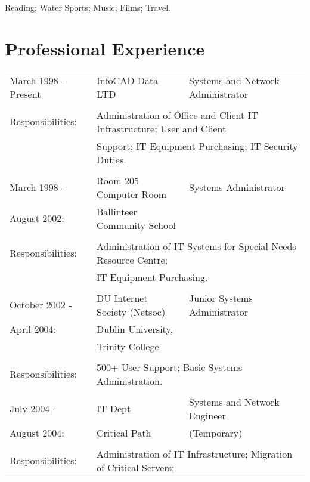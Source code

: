 \documentclass[a4paper, 11pt] {article}
\begin{document}
Reading; Water Sports; Music; Films; Travel.

\section*{Professional Experience}

\begin{tabular}{llll}
March 1998 - Present	&	InfoCAD Data LTD	& Systems and Network Administrator	&	\hspace{10mm}	\\
      	&			&              &            			\\
Responsibilities:	& \multicolumn{3}{l}{Administration of Office and Client IT Infrastructure; User and Client} 	\\
						& \multicolumn{3}{l}{Support; IT Equipment Purchasing; IT Security Duties.} 	\\
      				&              						&  &	\\
March 1998 -		& 	Room 205 Computer Room			&	Systems Administrator	& \hspace{10mm}	\\
August 2002:		&  Ballinteer Community School	&	&	\\
						& 		&	\\
Responsibilities:	& \multicolumn{3}{l}{Administration of IT Systems for Special Needs Resource Centre;} 	\\
						& \multicolumn{3}{l}{IT Equipment Purchasing.} 	\\
						&                      				&	&	\\
October 2002 - 	&  DU Internet Society (Netsoc)	&	Junior Systems Administrator	& \hspace{10mm}\\
April 2004:			& 	Dublin University,				&	&	\\
						&  Trinity College					&	&	\\
						& 											&	&	\\
Responsibilities:	& \multicolumn{3}{l}{500+ User Support; Basic Systems
Administration.} 	\\
						&											&	&	\\
July 2004 -			& IT Dept								&	Systems and Network Engineer	& \hspace{10mm}\\
August 2004:		& Critical Path						& (Temporary)	&	\\
						& 											&	&	\\
Responsibilities:	& \multicolumn{3}{l}{Administration of IT Infrastructure; Migration of Critical Servers;}	\\ 

\end{tabular}
\end{document}
